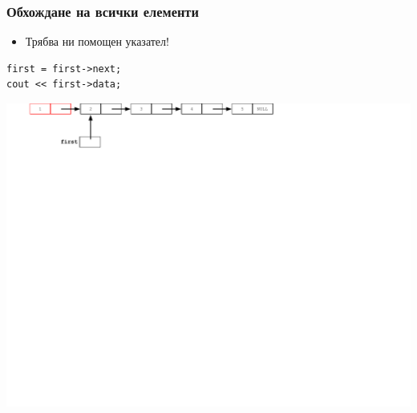 \documentclass{beamer}
\begin{document}
\begin{frame}[fragile]
\frametitle{Обхождане на всички елементи}

\begin{itemize}
  \item Трябва ни помощен указател!  
\end{itemize}

\begin{flushleft}
\begin{lstlisting}
first = first->next;
cout << first->data;
\end{lstlisting}  
\end{flushleft}


\includegraphics[width=14.0cm]{images/06_ll_pop}

\end{frame}
\end{document}
